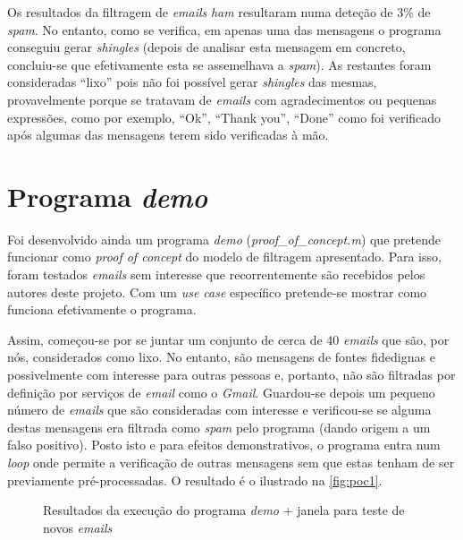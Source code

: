 \documentclass[a4paper,11pt,openright,oneside]{report}
\begin{document}
Os resultados da filtragem de \textit{emails} \textit{ham} resultaram numa deteção de 3\% de \textit{spam}. No entanto, como se verifica, em apenas uma das mensagens o programa conseguiu gerar \textit{shingles} (depois de analisar esta mensagem em concreto, concluiu-se que efetivamente esta se assemelhava a \textit{spam}). As restantes foram consideradas ``lixo'' pois não foi possível gerar \textit{shingles} das mesmas, provavelmente porque se tratavam de \textit{emails} com agradecimentos ou pequenas expressões, como por exemplo, ``Ok'', ``Thank you'', ``Done'' como foi verificado após algumas das mensagens terem sido verificadas à mão.

\section{Programa \textit{demo}}

Foi desenvolvido ainda um programa \textit{demo} (\textit{proof\_of\_concept.m}) que pretende funcionar como \textit{proof of concept} do modelo de filtragem apresentado. Para isso, foram testados \textit{emails} sem interesse que recorrentemente são recebidos pelos autores deste projeto. Com um \textit{use case} específico pretende-se mostrar como funciona efetivamente o programa.

Assim, começou-se por se juntar um conjunto de cerca de 40 \textit{emails} que são, por nós, considerados como lixo. No entanto, são mensagens de fontes fidedignas e possivelmente com interesse para outras pessoas e, portanto, não são filtradas por definição por serviços de \textit{email} como o \textit{Gmail}. Guardou-se depois um pequeno número de \textit{emails} que são consideradas com interesse e verificou-se se alguma destas mensagens era filtrada como \textit{spam} pelo programa (dando origem a um falso positivo). Posto isto e para efeitos demonstrativos, o programa entra num \textit{loop} onde permite a verificação de outras mensagens sem que estas tenham de ser previamente pré-processadas. O resultado é o ilustrado na \autoref{fig:poc1}.

\begin{figure}[ht]
\center
{}
\caption{Resultados da execução do programa \textit{demo} + janela para teste de novos \textit{emails}}
\label{fig:poc1}
\end{figure}
\end{document}
